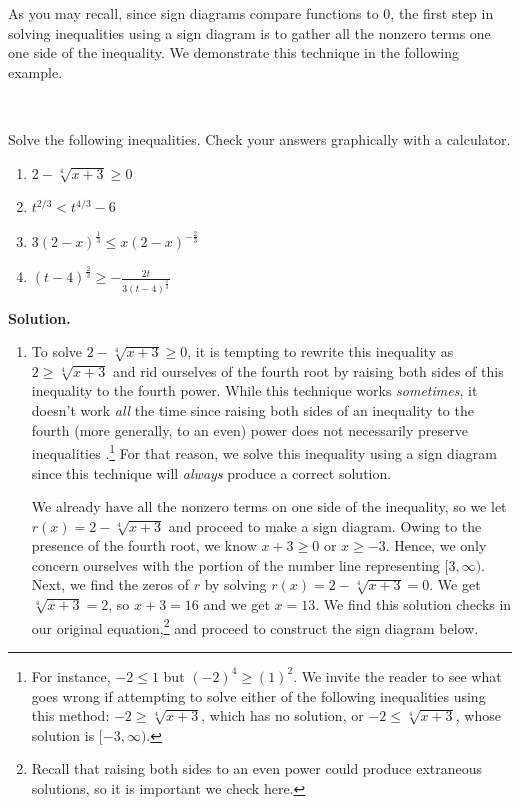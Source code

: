 \documentclass{ximera}
\begin{document}


As you may recall, since sign diagrams compare functions to $0$, the first step in solving inequalities using a sign diagram is to gather all the nonzero terms one one side of the inequality.  We demonstrate this technique in the following example.


\begin{example} \label{powerineqex} $~$

Solve the following inequalities.  Check your answers graphically with a calculator.


\begin{enumerate}

\item $2-\sqrt[4]{x+3} \geq 0$

\item $t^{2/3} < t^{4/3} - 6$


\item  \label{third} $3 (2-x)^{\frac{1}{3}} \leq x (2-x)^{-\frac{2}{3}}$

\item \label{fourth} $(t-4)^{\frac{2}{3}} \geq -\frac{2t}{3(t-4)^{\frac{1}{3}}}$  

\end{enumerate}



{\bf Solution.}  

\begin{enumerate}

\item  To solve $2-\sqrt[4]{x+3} \geq 0$, it is tempting to rewrite this inequality as $2 \geq \sqrt[4]{x+3}$ and rid ourselves of the fourth root by raising both sides of this inequality to the fourth power.  While this technique works \textit{sometimes}, it doesn't work \textit{all} the time since raising both sides of an inequality to the fourth (more generally, to an even) power does not necessarily preserve inequalities .\footnote{For instance, $-2 \leq 1$ but $(-2)^{4} \geq (1)^2$.  We invite the reader to see what goes wrong if attempting to solve either of the following inequalities using this method: $-2 \geq \sqrt[4]{x+3}$, which has no solution, or  $-2 \leq \sqrt[4]{x+3}$, whose solution is $[-3,\infty)$.}  For that reason, we solve this inequality using a sign diagram since this technique will \textit{always} produce a correct solution.    

We already have all the nonzero terms on one side of the inequality, so we let $r(x) = 2-\sqrt[4]{x+3}$ and proceed to make a sign diagram.  Owing to the presence of the fourth root, we know $x+3 \geq 0$ or  $x \geq -3$.   Hence, we only concern ourselves with the portion of the number line representing $[3, \infty)$.  Next, we find the zeros of $r$ by solving $r(x) = 2-\sqrt[4]{x+3}=0$.  We get $\sqrt[4]{x+3} = 2$, so $x+3= 16$ and we get $x=13$.  We find this solution checks in our original equation,\footnote{Recall that raising both sides to an even power could produce extraneous solutions, so it is important we check here.}  and proceed to construct the sign diagram below.


\end{enumerate}
\end{example}
\end{document}
